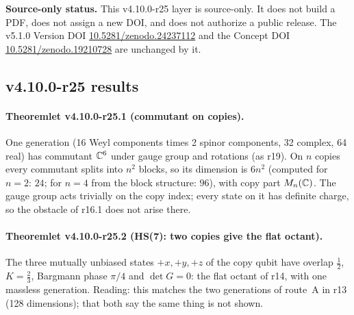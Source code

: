 \noindent\textbf{Source-only status.}
This v4.10.0-r25 layer is source-only.  It does not build a PDF, does not assign a new DOI,
and does not authorize a public release.  The v5.1.0 Version DOI
\href{https://doi.org/10.5281/zenodo.24237112}{10.5281/zenodo.24237112} and the Concept DOI
\href{https://doi.org/10.5281/zenodo.19210728}{10.5281/zenodo.19210728} are unchanged by it.

\subsection*{v4.10.0-r25 results}
\label{subsec:v4100-r25-results}

\paragraph{Theoremlet v4.10.0-r25.1 (commutant on copies).}
One generation (16 Weyl components times 2 spinor components, 32 complex, 64 real) has commutant \(\mathbb C^6\) under gauge group and rotations
(as r19).  On \(n\) copies every commutant splits into \(n^2\) blocks, so its dimension is \(6n^2\) (computed for \(n=2\): \(24\); for \(n=4\)
from the block structure: \(96\)), with copy part \(M_n(\mathbb C)\).  The gauge group acts trivially on the copy index; every state on it has
definite charge, so the obstacle of r16.1 does not arise there.

\paragraph{Theoremlet v4.10.0-r25.2 (HS(7): two copies give the flat octant).}
The three mutually unbiased states \(+x,+y,+z\) of the copy qubit have overlap \(\tfrac12\), \(K=\tfrac23\), Bargmann phase \(\pi/4\) and
\(\det G=0\): the flat octant of r14, with one massless generation.  Reading: this matches the two generations of route~A in r13 (128
dimensions); that both say the same thing is not shown.

